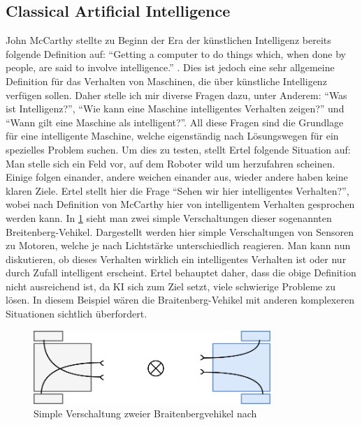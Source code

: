     \subsection{Classical Artificial Intelligence}
    John McCarthy stellte zu Beginn der Era der künstlichen Intelligenz bereits folgende Definition
    auf: ``Getting a computer to do things which, when done by people, are said to involve intelligence.'' 
    \cite[p. 1]{ertel2016grundkurs}. Dies ist jedoch eine sehr allgemeine Definition für das 
    Verhalten von Maschinen, die über künstliche Intelligenz verfügen sollen. Daher stelle ich mir 
    diverse Fragen dazu, unter Anderem: ``Was ist Intelligenz?'', ``Wie kann eine Maschine intelligentes
    Verhalten zeigen?'' und ``Wann gilt eine Maschine als intelligent?''. All diese Fragen sind die 
    Grundlage für eine intelligente Maschine, welche eigenständig nach Lösungswegen für ein spezielles
    Problem suchen. Um dies zu testen, stellt Ertel folgende Situation auf: Man stelle sich ein Feld 
    vor, auf dem Roboter wild um herzufahren scheinen. Einige folgen einander, andere weichen einander 
    aus, wieder andere haben keine klaren Ziele. \cite[p. 2]{ertel2016grundkurs} Ertel stellt hier die
    Frage ``Sehen wir hier intelligentes Verhalten?'', wobei nach Definition von McCarthy hier von 
    intelligentem Verhalten gesprochen werden kann. In \ref{pic:braitenberg-vehikel} sieht man zwei 
    simple Verschaltungen dieser sogenannten Breitenberg-Vehikel. Dargestellt werden hier simple 
    Verschaltungen von Sensoren zu Motoren, welche je nach Lichtstärke unterschiedlich reagieren. 
    Man kann nun diskutieren, ob dieses Verhalten wirklich ein intelligentes Verhalten ist oder
    nur durch Zufall intelligent erscheint. Ertel behauptet daher, dass die obige Definition nicht
    ausreichend ist, da KI sich zum Ziel setzt, viele schwierige Probleme zu lösen. In diesem Beispiel
    wären die Braitenberg-Vehikel mit anderen komplexeren Situationen sichtlich überfordert.
    
    \begin{figure}[h]\begin{center}
        \includegraphics[width=0.8\textwidth]{figures/braitenberg-roboter.png}
        \caption[Verschaltung Braitenberg-Vehikel]{Simple Verschaltung zweier Braitenbergvehikel nach \cite{ertel2016grundkurs}}
        \label{pic:braitenberg-vehikel}
    \end{center}\end{figure}
    

